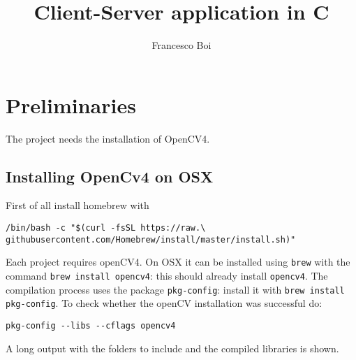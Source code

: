 \documentclass[12pt, letterpaper]{article}
\theoremstyle{definition}
\begin{document}
\title{Client-Server application in C}
\author{Francesco Boi}
\date{\vspace{-5ex}}
\maketitle
{}
\tableofcontents

\section{Preliminaries}
The project needs the installation of OpenCV4.

\subsection{Installing OpenCv4 on OSX}
First of all install homebrew with 
\begin{lstlisting}
/bin/bash -c "$(curl -fsSL https://raw.\
githubusercontent.com/Homebrew/install/master/install.sh)"
\end{lstlisting}

Each project requires openCV4. On OSX it can be installed using \lstinline+brew+ with the command \lstinline+brew install opencv4+: this should already install \lstinline+opencv4+. The compilation process uses the package \lstinline+pkg-config+: install it with \lstinline+brew install pkg-config+. To check whether the openCV installation was successful do: 
\begin{lstlisting}
pkg-config --libs --cflags opencv4
\end{lstlisting}
A long output with the folders to include and the compiled libraries is shown.
\end{document}
